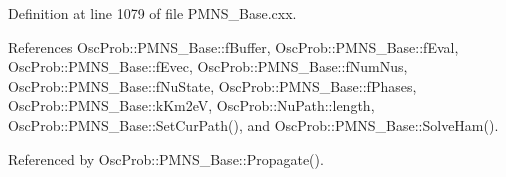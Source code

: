 Definition at line 1079 of file P\+M\+N\+S\+\_\+\+Base.\+cxx.



References Osc\+Prob\+::\+P\+M\+N\+S\+\_\+\+Base\+::f\+Buffer, Osc\+Prob\+::\+P\+M\+N\+S\+\_\+\+Base\+::f\+Eval, Osc\+Prob\+::\+P\+M\+N\+S\+\_\+\+Base\+::f\+Evec, Osc\+Prob\+::\+P\+M\+N\+S\+\_\+\+Base\+::f\+Num\+Nus, Osc\+Prob\+::\+P\+M\+N\+S\+\_\+\+Base\+::f\+Nu\+State, Osc\+Prob\+::\+P\+M\+N\+S\+\_\+\+Base\+::f\+Phases, Osc\+Prob\+::\+P\+M\+N\+S\+\_\+\+Base\+::k\+Km2eV, Osc\+Prob\+::\+Nu\+Path\+::length, Osc\+Prob\+::\+P\+M\+N\+S\+\_\+\+Base\+::\+Set\+Cur\+Path(), and Osc\+Prob\+::\+P\+M\+N\+S\+\_\+\+Base\+::\+Solve\+Ham().



Referenced by Osc\+Prob\+::\+P\+M\+N\+S\+\_\+\+Base\+::\+Propagate().



